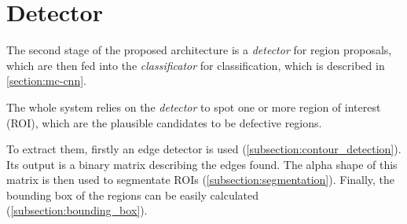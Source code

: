 \section{Detector}\label{section:region_proposals}
    \par{
        The second stage of the proposed architecture is a \emph{detector} for region proposals, which are then fed into the \emph{classificator} for classification, which is described in \ref{section:mc-cnn}.
    }
    \par{
        The whole system relies on the \emph{detector} to spot one or more region of interest (ROI), which are the plausible candidates to be defective regions.
    }
    \par{
        To extract them, firstly an edge detector is used (\ref{subsection:contour_detection}). Its output is a binary matrix describing the edges found. The alpha shape of this matrix is then used to segmentate ROIs (\ref{subsection:segmentation}). Finally, the bounding box of the regions can be easily calculated (\ref{subsection:bounding_box}).
    }
